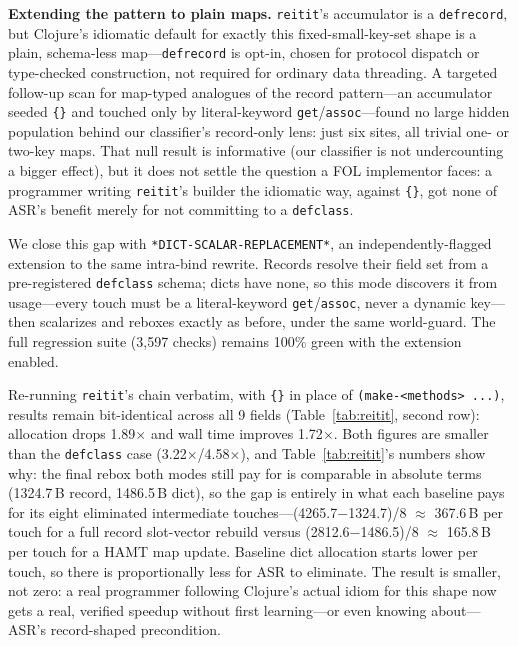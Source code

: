 \documentclass[sigplan,screen,review,anonymous]{acmart}
\begin{document}
\textbf{Extending the pattern to plain maps.} \texttt{reitit}'s accumulator is
a \texttt{defrecord}, but Clojure's idiomatic default for exactly this
fixed-small-key-set shape is a plain, schema-less map---\texttt{defrecord} is
opt-in, chosen for protocol dispatch or type-checked construction, not
required for ordinary data threading. A targeted follow-up scan for map-typed
analogues of the record pattern---an accumulator seeded \texttt{\{\}} and
touched only by literal-keyword \texttt{get}/\texttt{assoc}---found no large
hidden population behind our classifier's record-only lens: just six sites,
all trivial one- or two-key maps. That null result is informative
(our classifier is not undercounting a bigger effect), but it does
not settle the question a FOL implementor
faces: a programmer writing \texttt{reitit}'s builder the idiomatic way,
against \texttt{\{\}}, got none of ASR's benefit merely for not
committing to a \texttt{defclass}.

We close this gap with \texttt{*DICT-SCALAR-REPLACEMENT*}, an
independently-flagged extension to the same intra-bind rewrite. Records
resolve their field set from a pre-registered \texttt{defclass} schema; dicts
have none, so this mode discovers it from usage---every touch must be
a literal-keyword \texttt{get}/\texttt{assoc}, never a dynamic key---then
scalarizes and reboxes exactly as before, under the same world-guard. The
full regression suite (3{,}597 checks) remains 100\% green with the extension
enabled.

Re-running \texttt{reitit}'s chain verbatim, with \texttt{\{\}} in place of
\texttt{(make-<methods> ...)}, results remain bit-identical across all 9
fields (Table~\ref{tab:reitit}, second row): allocation drops
1.89$\times$ and wall time improves 1.72$\times$. Both figures are smaller
than the \texttt{defclass} case (3.22$\times$/4.58$\times$), and
Table~\ref{tab:reitit}'s numbers show why: the final rebox both modes
still pay for is comparable in absolute terms (1324.7\,B record,
1486.5\,B dict), so the gap is entirely in what each baseline pays for its
eight eliminated intermediate touches---(4265.7$-$1324.7)/8 $\approx$
367.6\,B per touch for a full record slot-vector rebuild versus
(2812.6$-$1486.5)/8 $\approx$ 165.8\,B per touch for a HAMT map update.
Baseline dict allocation starts lower per touch, so there is proportionally
less for ASR to eliminate. The result is smaller, not zero: a real
programmer following Clojure's actual idiom for this shape now gets a
real, verified speedup without first learning---or even knowing
about---ASR's record-shaped precondition.
\end{document}
